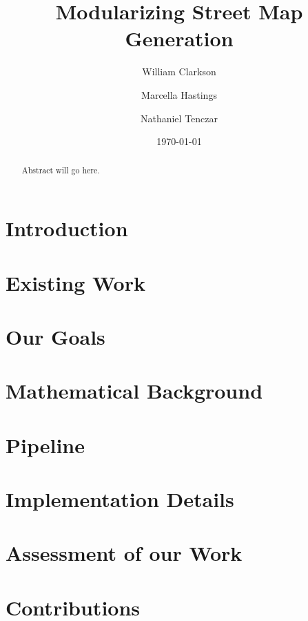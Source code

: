 \documentclass[twocolumn]{article}
\title{Modularizing Street Map Generation}
\author{William Clarkson \and Marcella Hastings \and Nathaniel Tenczar}
\date{\today}
\begin{document}
\maketitle

\begin{abstract}
    Abstract will go here.
\end{abstract}

\section{Introduction}

\section{Existing Work}

\section{Our Goals}

\section{Mathematical Background}

\section{Pipeline}

\section{Implementation Details}

\section{Assessment of our Work}

\section{Contributions}



\end{document}
